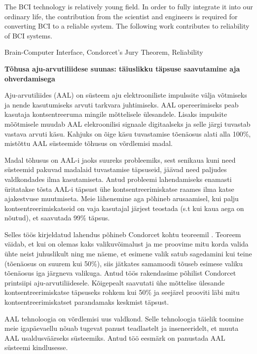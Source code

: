 \documentclass[12pt]{article}
\theoremstyle{definition}
\begin{document}
The BCI technology is relatively young field. In order to fully integrate it into our ordinary life, the contribution from the scientist and engineers is required for converting BCI to a reliable system. The following work contributes to reliability of BCI systems.


\vspace*{3ex}
{}
Brain-Computer Interface, Condorcet's Jury Theorem, Reliability
\vspace*{3ex}

\newpage
{}
\noindent\textbf{\large Tõhusa aju-arvutiliidese suunas: täiuslikku täpsuse saavutamine aja ohverdamisega}
\vspace*{2ex}
{ }

Aju-arvutiliides (AAL) on süsteem aju elektrooniliste impulssite välja võtmiseks ja nende kasutumiseks arvuti tarkvara juhtimiseks. AAL opereerimiseks peab kasutaja kontsentreeruma mingile mõttelisele ülesandele. Lisaks impulsite mõõtmisele muudab AAL elekroonilisi signaale digitaalseks ja selle järgi tuvastab vastava arvuti käsu. Kahjuks on õige käsu tuvastamise tõenäosus alati alla
100\%, mistõttu  AAL süsteemide tõhusus on võrdlemisi madal.

Madal tõhusus on AAL-i jaoks suureks probleemiks, sest senikaua kuni need süsteemid pakuvad madalaid tuvastamise täpsuseid, jäävad need paljudes valdkondades ilma kasutamiseta. Antud probleemi lahendamiseks enamasti üritatakse tõsta AAL-i täpsust ühe kontsentreerimiskatse raames ilma katse ajakestvuse muutmiseta. Meie lähenemine aga põhineb arusaamisel, kui palju kontsentreerimiskatseid on vaja kasutajal järjest teostada (s.t kui kaua aega on nõutud), et saavutada 99\% täpsus.

Selles töös kirjeldatud lahendus põhineb Condorcet kohtu teoreemil \cite{condorcets}. Teoreem väidab, et kui on olemas kaks valikuvõimalust ja me proovime mitu korda valida ühte neist juhuslikult ning me näeme, et esimene valik satub sagedamini kui teine (tõenäosus on suurem kui 50\%), siis jätkates samamoodi tõuseb esimese valiku tõenäosus iga järgneva valikuga. Antud töös rakendasime põhilist Condorcet printsiipi aju-arvutiliidesele. Kõigepealt saavutati ühe mõttelise ülesande kontsentreerimiskatse täpsuseks rohkem kui 50\% ja seejärel prooviti läbi mitu kontsentreerimiskatset parandamaks keskmist täpsust.

AAL tehnoloogia on võrdlemisi uus valdkond. Selle tehnoloogia täielik toomine meie igapäevaellu nõuab tugevat panust teadlastelt ja inseneeridelt, et muuta AAL usaldusväärseks süsteemiks. Antud töö eesmärk on panustada AAL süsteemi kindlusesse.
\end{document}
